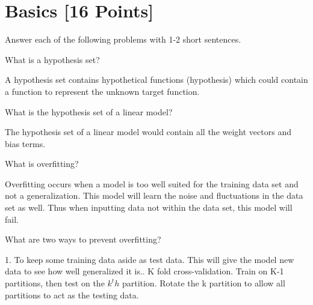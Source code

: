 \newif\ifshowsolutions
\showsolutionstrue





\pagestyle{fancy}

\graphicspath{ {./images/} }



\newpage
\section{Basics [16 Points]}

Answer each of the following problems with 1-2 short sentences.

\begin{problem}[2]
  What is a hypothesis set?
\end{problem}
\begin{solution}
  A hypothesis set contains hypothetical functions (hypothesis) which could contain a function to represent the unknown target function.
\end{solution}

\begin{problem}[2]
  What is the hypothesis set of a linear model?
\end{problem}
\begin{solution}
  The hypothesis set of a linear model would contain all the weight vectors and bias terms. 
\end{solution}

\begin{problem}[2]
  What is overfitting?
\end{problem}
\begin{solution}
  Overfitting occurs when a model is too well suited for the training data set and not a generalization. This model will learn the noise and fluctuations in the data set as well. Thus when inputting data not within the data set, this model will fail. 
\end{solution}

\begin{problem}[2]
  What are two ways to prevent overfitting?
\end{problem}
\begin{solution}
  1. To keep some training data aside as test data. This will give the model new data to see how well generalized it is.. K fold cross-validation. Train on K-1 partitions, then test on the $k^th$ partition. Rotate the k partition to allow all partitions to act as the testing data. 
\end{solution}

